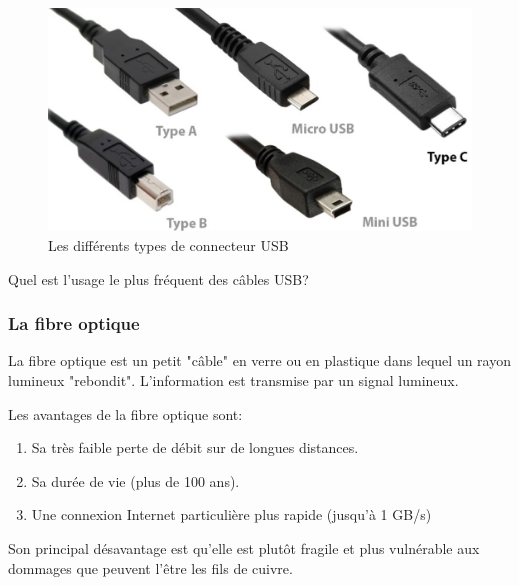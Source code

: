 \documentclass[11pt, a4paper]{book}
\begin{document}
\begin{figure}[h]
\begin{center}
\includegraphics[scale=.4]{images/usb}
\caption{Les différents types de connecteur USB}
\end{center}
\end{figure}

\begin{exercice}
Quel est l'usage le plus fréquent des câbles USB?
\end{exercice}



\subsubsection{La fibre optique}

La fibre optique est un petit "câble" en verre ou en plastique dans lequel un rayon lumineux "rebondit". L'information est transmise par un signal lumineux.

Les avantages de la fibre optique sont:
\begin{enumerate}
\item Sa très faible perte de débit sur de longues distances.
\item Sa durée de vie (plus de 100 ans).
\item Une connexion Internet particulière plus rapide (jusqu'à 1 GB/s)
\end{enumerate}

Son principal désavantage est qu'elle est plutôt fragile et plus vulnérable aux dommages que peuvent l'être les fils de cuivre.
\end{document}
